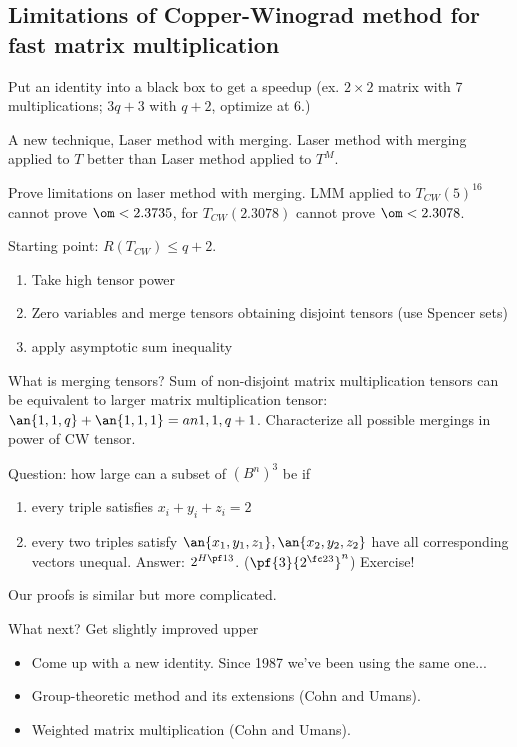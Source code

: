 
\subsection{Limitations of Copper-Winograd method for fast matrix multiplication}

Put an identity into a black box to get a speedup (ex. $2\times 2$ matrix with 7 multiplications; $3q+3$ with $q+2$, optimize at 6.)

A new technique, Laser method with merging.
Laser method with merging applied to $T$ better than Laser method applied to $T^M$.

Prove limitations on laser method with merging. 
LMM applied to $T_{CW}(5)^{16}$ cannot prove $\om<2.3735$, for $T_{CW}(2.3078)$ cannot prove $\om<2.3078$.

Starting point: $R(T_{CW})\le q+2$. 
\begin{enumerate}
\item Take high tensor power
\item Zero variables and merge tensors obtaining disjoint tensors (use Spencer sets)
\item apply asymptotic  sum inequality
\end{enumerate}

What is merging tensors? Sum of non-disjoint matrix multiplication tensors can be equivalent to larger matrix multiplication tensor: $\an{1,1,q}+\an{1,1,1}=\\an{1,1,q+1}$.
Characterize all possible mergings in power of CW tensor.

Question:
how large can a subset of $(B^n)^3$ be if 
\begin{enumerate}
\item
every triple satisfies $x_i+y_i+z_i=2$
\item
every two triples satisfy $\an{x_1,y_1,z_1},\an{x_2,y_2,z_2}$ have all corresponding vectors unequal. Answer: $2^{H\pf 13}$. ($\pf{3}{2^{\fc 23}}^n$) Exercise!
\end{enumerate}
Our proofs is similar but more complicated.

What next? Get slightly improved upper 

\begin{itemize}
\item
Come up with a new identity. Since 1987 we've been using the same one...
\item
Group-theoretic method and its extensions (Cohn and Umans).
\item
Weighted matrix multiplication (Cohn and Umans).
\end{itemize}